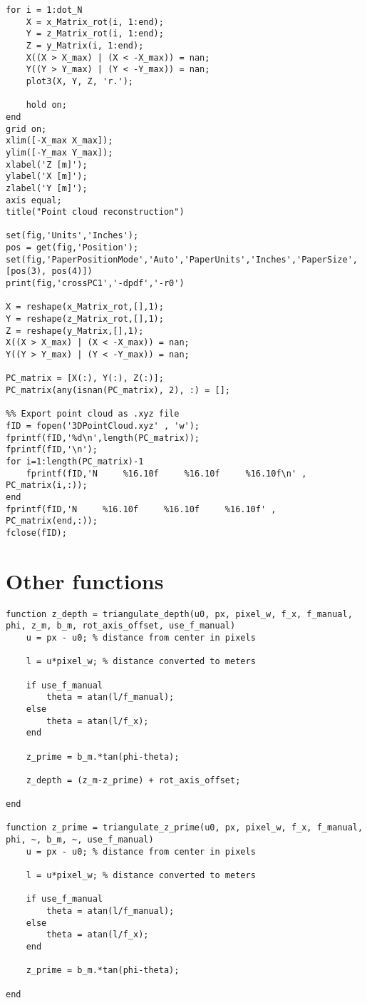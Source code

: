 \begin{appendices}
\begin{verbatim}
for i = 1:dot_N
    X = x_Matrix_rot(i, 1:end);
    Y = z_Matrix_rot(i, 1:end);
    Z = y_Matrix(i, 1:end);
    X((X > X_max) | (X < -X_max)) = nan;
    Y((Y > Y_max) | (Y < -Y_max)) = nan;
    plot3(X, Y, Z, 'r.');
    
    hold on;
end
grid on;
xlim([-X_max X_max]);
ylim([-Y_max Y_max]);
xlabel('Z [m]');
ylabel('X [m]');
zlabel('Y [m]');
axis equal;
title("Point cloud reconstruction")

set(fig,'Units','Inches');
pos = get(fig,'Position');
set(fig,'PaperPositionMode','Auto','PaperUnits','Inches','PaperSize',[pos(3), pos(4)])
print(fig,'crossPC1','-dpdf','-r0')

X = reshape(x_Matrix_rot,[],1);
Y = reshape(z_Matrix_rot,[],1);
Z = reshape(y_Matrix,[],1);
X((X > X_max) | (X < -X_max)) = nan;
Y((Y > Y_max) | (Y < -Y_max)) = nan;

PC_matrix = [X(:), Y(:), Z(:)];
PC_matrix(any(isnan(PC_matrix), 2), :) = [];

%% Export point cloud as .xyz file
fID = fopen('3DPointCloud.xyz' , 'w');
fprintf(fID,'%d\n',length(PC_matrix)); 
fprintf(fID,'\n'); 
for i=1:length(PC_matrix)-1 
    fprintf(fID,'N     %16.10f     %16.10f     %16.10f\n' ,  PC_matrix(i,:));
end
fprintf(fID,'N     %16.10f     %16.10f     %16.10f' ,  PC_matrix(end,:));
fclose(fID);

\end{verbatim}


\section{Other functions}

\begin{verbatim}
function z_depth = triangulate_depth(u0, px, pixel_w, f_x, f_manual, phi, z_m, b_m, rot_axis_offset, use_f_manual)
    u = px - u0; % distance from center in pixels

    l = u*pixel_w; % distance converted to meters
    
    if use_f_manual
        theta = atan(l/f_manual);
    else
        theta = atan(l/f_x);
    end
    
    z_prime = b_m.*tan(phi-theta);
    
    z_depth = (z_m-z_prime) + rot_axis_offset;

end

function z_prime = triangulate_z_prime(u0, px, pixel_w, f_x, f_manual, phi, ~, b_m, ~, use_f_manual)
    u = px - u0; % distance from center in pixels

    l = u*pixel_w; % distance converted to meters
    
    if use_f_manual
        theta = atan(l/f_manual);
    else
        theta = atan(l/f_x);
    end
    
    z_prime = b_m.*tan(phi-theta);

end

\end{verbatim}

\end{appendices}
